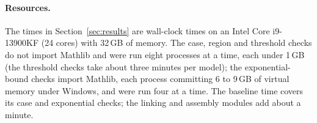 \documentclass[11pt,a4paper]{article}
\begin{document}
\paragraph{Resources.}
The times in Section~\ref{sec:results} are wall-clock times on an Intel Core
i9-13900KF (24 cores) with 32\,GB of memory. The case, region and threshold
checks do not import Mathlib and were run eight processes at a time, each under
1\,GB (the threshold checks take about three minutes per model); the
exponential-bound checks import Mathlib, each process committing 6 to 9\,GB of
virtual memory under Windows, and were run four at a time. The baseline time
covers its case and exponential checks; the linking and assembly modules add
about a minute.
\end{document}
